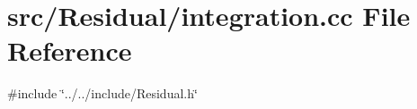 \section{src/\+Residual/integration.cc File Reference}
\label{integration_8cc}
{\ttfamily \#include \char`\"{}../../include/\+Residual.\+h\char`\"{}}\newline
